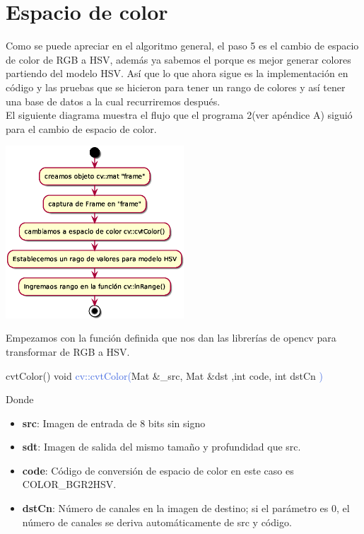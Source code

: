 \section{Espacio de color}
Como se puede apreciar en el algoritmo general, el paso 5 es el cambio de espacio de color
de RGB a HSV, además ya sabemos el porque es mejor generar colores partiendo del
modelo HSV. Así que lo que ahora sigue es la implementación en código y las pruebas
que se hicieron para tener un rango de colores y así tener una base de datos a la
cual recurriremos después.\\
El siguiente diagrama muestra el flujo que el programa 2(ver apéndice A) siguió para
el cambio de espacio de color.
\begin{center}
	\includegraphics[width=0.5\textwidth]{Contenido/Cuerpo/Capitulo4/color.eps}
	\label{color}
\end{center}
Empezamos con la función definida que nos dan las librerías de opencv para transformar
de RGB a HSV.
\begin{example}[label={ex:serie}]{cvtColor()}
	\textcolor{Mulberry}{void} \textcolor{RoyalBlue}{cv::cvtColor(}\textcolor{BurntOrange}{Mat}
	\textcolor{Mulberry}{\&}\textcolor{Bittersweet}{\_src}, \textcolor{BurntOrange}{Mat} \textcolor{Mulberry}{\&}\textcolor{Bittersweet}{dst}
	,\textcolor{Mulberry}{int} \textcolor{Bittersweet}{code}, \textcolor{Mulberry}{int} \textcolor{Bittersweet}{dstCn}
	\textcolor{RoyalBlue}{)}
\end{example}
Donde
\begin{itemize}
	\item \textbf{src}: Imagen de entrada de 8 bits sin signo
	\item \textbf{sdt}: Imagen de salida del mismo tamaño y profundidad que src.
	\item \textbf{code}: Código de conversión de espacio de color en este caso es \\COLOR\_BGR2HSV.
	\item \textbf{dstCn}: Número de canales en la imagen de destino; si el parámetro es 0, el
	      número de canales se deriva automáticamente de src y código.
\end{itemize}
